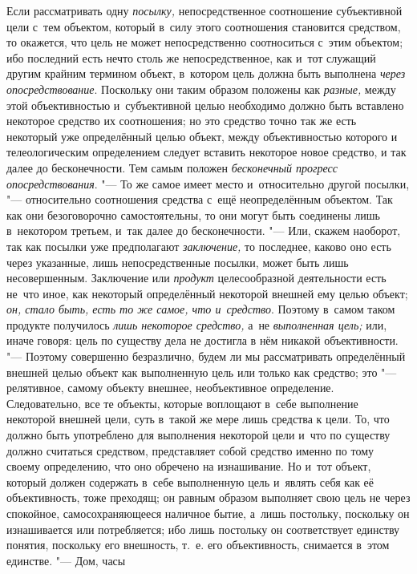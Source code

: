 Если рассматривать одну
{\em посылку,}
непосредственное соотношение субъективной цели с~тем
объектом, который в~силу этого соотношения становится средством, то
окажется, что цель не может непосредственно соотноситься с~этим объектом;
ибо последний есть нечто столь же непосредственное, как и~тот служащий
другим крайним термином объект, в~котором цель должна быть выполнена
{\em через опосредствование}.
Поскольку они таким образом положены как
{\em разные,} между этой
объективностью и~субъективной целью необходимо должно быть вставлено
некоторое средство их соотношения; но это средство точно так же есть
некоторый уже определённый целью объект, между объективностью которого и
телеологическим определением следует вставить некоторое новое средство, и
так далее до бесконечности. Тем самым положен
{\em бесконечный прогресс}
{\em опосредствования}. "---
То же самое имеет место и~относительно другой
посылки, "--- относительно соотношения средства с~ещё
неопределённым объектом. Так как они безоговорочно самостоятельны, то они
могут быть соединены лишь в~некотором третьем, и~так далее до
бесконечности. "--- Или, скажем наоборот, так как посылки уже
предполагают {\em заключение,}
то последнее, каково оно есть через указанные, лишь
непосредственные посылки, может быть лишь несовершенным. Заключение или
{\em продукт} целесообразной деятельности есть не~что иное, как некоторый
определённый некоторой внешней ему целью объект;
{\em он, стало быть, есть то же самое,
что и~средство}. Поэтому в~самом таком продукте получилось
{\em лишь некоторое средство,} а~не {\em выполненная
цель;} или, иначе говоря: цель по существу дела не достигла
в нём никакой объективности. "--- Поэтому совершенно
безразлично, будем ли мы рассматривать определённый внешней целью объект
как выполненную цель или только как средство; это
"--- релятивное, самому объекту внешнее, необъективное
определение. Следовательно, все те объекты, которые воплощают в~себе
выполнение некоторой внешней цели, суть в~такой же мере лишь средства к
цели. То, что должно быть употреблено для выполнения некоторой цели и~что
по существу должно считаться средством, представляет собой средство именно
по тому своему определению, что оно обречено на изнашивание. Но и~тот
объект, который должен содержать в~себе выполненную цель и~являть себя как
её объективность, тоже преходящ; он равным образом выполняет свою цель не
через спокойное, самосохраняющееся наличное бытие, а~лишь постольку,
поскольку он изнашивается или потребляется; ибо лишь постольку он
соответствует единству понятия, поскольку его внешность, т.~е. его
объективность, снимается в~этом единстве. "--- Дом, часы
